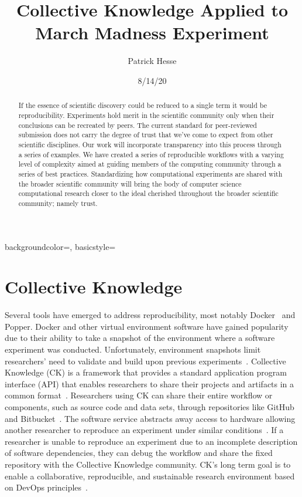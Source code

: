 \documentclass{IEEEtran}
\title{Collective Knowledge Applied to March Madness Experiment}
\author{Patrick Hesse}
\date{8/14/20}
\begin{document}

\maketitle
\pagestyle{plain}
{
    backgroundcolor=\color{white},
    basicstyle=\scriptsize\color{black}\ttfamily
}
\newcommand{\code}[1]{\colorbox{light-gray}{\texttt{#1}}}

\begin{abstract}
    If the essence of scientific discovery could be reduced to a single term it would be reproducibility. Experiments hold merit in the scientific community only when their conclusions can be recreated by peers. The current standard for peer-reviewed submission does not carry the degree of trust that we’ve come to expect from other scientific disciplines. Our work will incorporate transparency into this process through a series of examples. We have created a series of reproducible workflows with a varying level of complexity aimed at guiding members of the computing community through a series of best practices. Standardizing how computational experiments are shared with the broader scientific community will bring the body of computer science computational research closer to the ideal cherished throughout the broader scientific community; namely trust.
\end{abstract}

\tableofcontents

\listoffigures

\clearpage

\section{Collective Knowledge}
Several tools have emerged to address reproducibility, most notably Docker~\cite{ITD} and Popper. Docker and other virtual environment software have gained popularity due to their ability to take a snapshot of the environment where a software experiment was conducted. Unfortunately, environment snapshots limit researchers' need to validate and build upon previous experiments~\cite{CKTS}.
Collective Knowledge (CK) is a framework that provides a standard application program interface (API) that enables researchers to share their projects and artifacts in a common format~\cite{ctuning/ck}. Researchers using CK can share their entire workflow or components, such as source code and data sets, through repositories like GitHub and Bitbucket~\cite{CKTS}. The software service abstracts away access to hardware allowing another researcher to reproduce an experiment under similar conditions~\cite{CKTS}. If a researcher is unable to reproduce an experiment due to an incomplete description of software dependencies, they can debug the workflow and share the fixed repository with the Collective Knowledge community. 
CK's long term goal is to enable a collaborative, reproducible, and sustainable research environment based on DevOps principles~\cite{ctuning/ck}.
\end{document}
